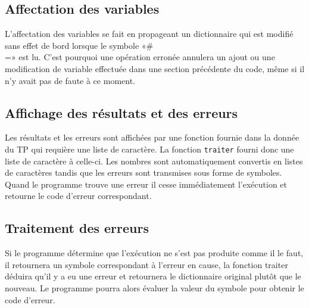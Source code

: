 \documentclass{article}
\begin{document}
\subsection{Affectation des variables}
L'affectation des variables se fait en propageant un dictionnaire qui est modifié sans effet de bord lorsque le symbole «#\\=» est lu. C'est pourquoi une opération erronée annulera un ajout ou une modification de variable effectuée dans une section précédente du code, même si il n'y avait pas de faute à ce moment.

\subsection{Affichage des résultats et des erreurs}
Les résultats et les erreurs sont affichées par une fonction fournie dans la donnée du TP qui requière une liste de caractère. La fonction \texttt{traiter} fourni donc une liste de caractère à celle-ci. Les nombres sont automatiquement convertis en listes de caractères tandis que les erreurs sont transmises sous forme de symboles. Quand le programme trouve une erreur il cesse immédiatement l'exécution et retourne le code d'erreur correspondant.

\subsection{Traitement des erreurs}
Si le programme détermine que l'exécution ne s'est pas produite comme il le faut, il retournera un symbole correspondant à l'erreur en cause, la fonction traiter déduira qu'il y a eu une erreur et retournera le dictionnaire original plutôt que le nouveau. Le programme pourra alors évaluer la valeur du symbole pour obtenir le code d'erreur.
\end{document}
